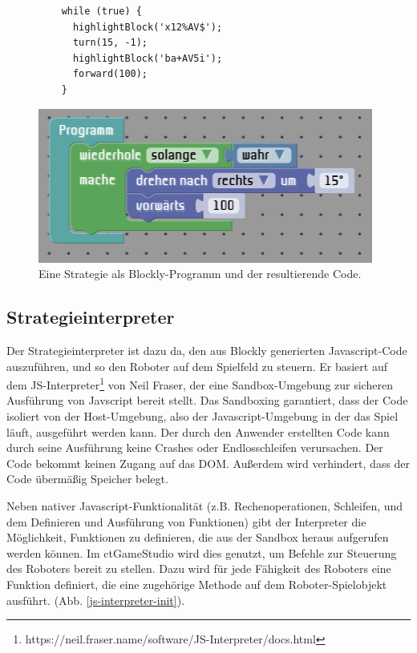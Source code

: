 \begin{figure}
  \caption{Eine Strategie als Blockly-Programm und der resultierende Code.}

  \label{code-generation}

  \begin{lstlisting}
    while (true) {
      highlightBlock('x12%AV$');
      turn(15, -1);
      highlightBlock('ba+AV5i');
      forward(100);
    }
  \end{lstlisting}

  \includegraphics{figures/code-generation-blockly.png}
\end{figure}


\subsection{Strategieinterpreter}

Der Strategieinterpreter ist dazu da, den aus Blockly generierten Javascript-Code auszuführen, und
so den Roboter auf dem Spielfeld zu steuern. Er basiert auf dem
JS-Interpreter\footnote{https://neil.fraser.name/software/JS-Interpreter/docs.html} von Neil Fraser,
der eine Sandbox-Umgebung zur sicheren Ausführung von Javscript bereit stellt. Das Sandboxing
garantiert, dass der Code isoliert von der Host-Umgebung, also der Javascript-Umgebung in der das
Spiel läuft, ausgeführt werden kann. Der durch den Anwender erstellten Code kann durch seine
Ausführung keine Crashes oder Endlosschleifen verursachen. Der Code bekommt keinen Zugang auf das
DOM. Außerdem wird verhindert, dass der Code übermäßig Speicher belegt.

Neben nativer Javascript-Funktionalität (z.B. Rechenoperationen, Schleifen, und dem Definieren und
Ausführung von Funktionen) gibt der Interpreter die Möglichkeit, Funktionen zu definieren, die aus
der Sandbox heraus aufgerufen werden können. Im ctGameStudio wird dies genutzt, um Befehle zur
Steuerung des Roboters bereit zu stellen. Dazu wird für jede Fähigkeit des Roboters eine Funktion
definiert, die eine zugehörige Methode auf dem Roboter-Spielobjekt ausführt. (Abb.
\ref{js-interpreter-init}).

